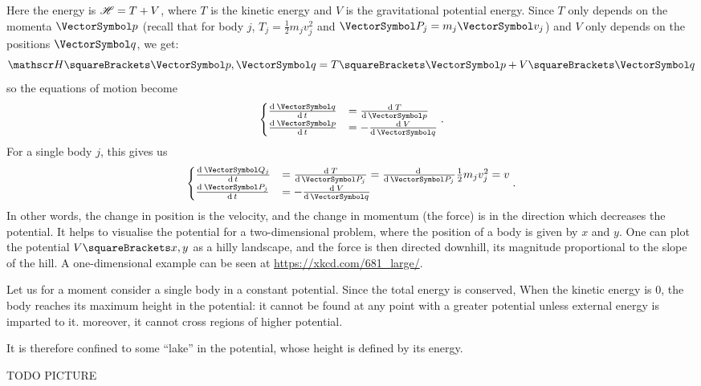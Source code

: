 \documentclass[10pt, a4paper, twoside]{basestyle}
\begin{document}
Here the energy is $\mathscr{H} = T + V$, where $T$ is the kinetic energy
and $V$ is the gravitational potential energy.
Since $T$ only depends on the momenta $\vp$ (recall that for body $j$,
$T_j = \frac{1}{2} m_j v_j^2$ and $\vP_j = m_j\vv_j$) and $V$ only depends
on the positions $\vq$, we get:
\[
\Hamiltonian\of{\vp, \vq} = T\of{\vp} + V\of{\vq}
\]
so the equations of motion become
\[
\begin{cases}
\deriv t {\vq} &= \deriv {\vp} T \\
\deriv t {\vp} &= -\deriv {\vq} V
\end{cases}.
\]
For a single body $j$, this gives us
\[
\begin{cases}
\deriv t {\vQ_j} &= \deriv {\vP_j} T = \derivop {\vP_j}\frac{1}{2} m_j v_j^2
    = v \\
\deriv t {\vP_j} &= -\deriv {\vq} V
\end{cases}.
\]
In other words, the change in position is the velocity, and the change in
momentum (the force) is in the direction which decreases the potential.
It helps to visualise the potential for a two-dimensional problem, where the
position of a body is given by $x$ and $y$. One can plot the potential
$V\of{x, y}$ as a hilly landscape, and the force is then directed downhill,
its magnitude proportional to the slope of the hill. A one-dimensional example
can be seen at \url{https://xkcd.com/681_large/}.

Let us for a moment consider a single body in a constant potential.
Since the total energy is conserved, When the kinetic energy is $0$, the body
reaches its maximum height in the potential: it cannot be found at any point with a greater potential unless external energy is imparted to it.
moreover, it cannot cross regions of higher potential.

It is therefore confined to some ``lake'' in the potential, whose height is
defined by its energy.

TODO PICTURE
\end{document}
